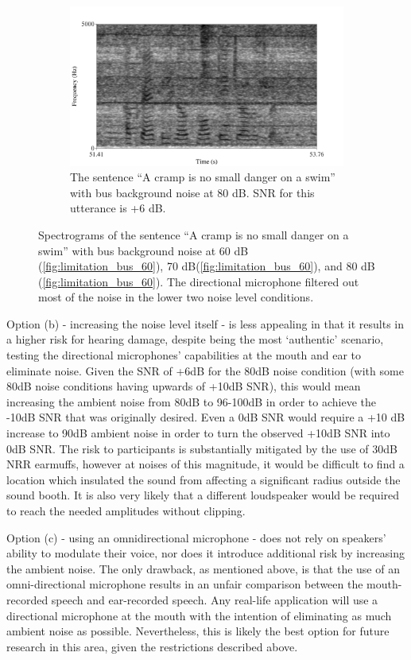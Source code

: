 \begin{figure}[h!]
\begin{center}
\begin{subfigure}{0.475\textwidth}
  \includegraphics[width=1\linewidth]{figure/spctgrm_cramp_bus_80.png}
  \caption{The sentence ``A cramp is no small danger on a swim'' with bus background noise at 80 dB. SNR for this utterance is +6 dB.}
  \label{fig:limitation_bus_80}
\end{subfigure}
\end{center}
\caption{Spectrograms of the sentence ``A cramp is no small danger on a swim'' with bus background noise at 60 dB (\ref{fig:limitation_bus_60}), 70 dB(\ref{fig:limitation_bus_60}), and 80 dB (\ref{fig:limitation_bus_60}). The directional microphone filtered out most of the noise in the lower two noise level conditions.}
\label{fig:noise_level_limitation}
\end{figure}

Option (b) - increasing the noise level itself - is less appealing in that it results in a higher risk for hearing damage, despite being the most `authentic' scenario, testing the directional microphones' capabilities at the mouth and ear to eliminate noise.  Given the SNR of +6dB for the 80dB noise condition (with some 80dB noise conditions having upwards of +10dB SNR), this would mean increasing the ambient noise from 80dB to 96-100dB in order to achieve the -10dB SNR that was originally desired.  Even a 0dB SNR would require a +10 dB increase to 90dB ambient noise in order to turn the observed +10dB SNR into 0dB SNR. The risk to participants is substantially mitigated by the use of 30dB NRR earmuffs, however at noises of this magnitude, it would be difficult to find a location which insulated the sound from affecting a significant radius outside the sound booth.  It is also very likely that a different loudspeaker would be required to reach the needed amplitudes without clipping.

Option (c) - using an omnidirectional microphone - does not rely on speakers' ability to modulate their voice, nor does it introduce additional risk by increasing the ambient noise.  The only drawback, as mentioned above, is that the use of an omni-directional microphone results in an unfair comparison between the mouth-recorded speech and ear-recorded speech.  Any real-life application will use a directional microphone at the mouth with the intention of eliminating as much ambient noise as possible.  Nevertheless, this is likely the best option for future research in this area, given the restrictions described above.

